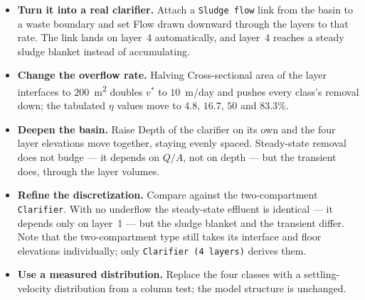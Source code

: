 \documentclass[11pt,a4paper]{article}
\newcommand{\code}[1]{\texttt{\small #1}}
\newcommand{\menu}[1]{\textsf{#1}}
\begin{document}
\begin{itemize}[leftmargin=1.4em]
\item \textbf{Turn it into a real clarifier.} Attach a \code{Sludge flow} link
      from the basin to a waste boundary and set \menu{Flow drawn downward
      through the layers} to that rate. The link lands on layer~4 automatically,
      and layer~4 reaches a steady sludge blanket instead of accumulating.
\item \textbf{Change the overflow rate.} Halving \menu{Cross-sectional area of
      the layer interfaces} to $200$~m\textsuperscript{2} doubles $v^{*}$ to
      $10$~m/day and pushes every class's removal down; the tabulated $\eta$
      values move to $4.8$, $16.7$, $50$ and $83.3\%$.
\item \textbf{Deepen the basin.} Raise \menu{Depth of the clarifier} on its own
      and the four layer elevations move together, staying evenly spaced.
      Steady-state removal does not budge --- it depends on $Q/A$, not on depth
      --- but the transient does, through the layer volumes.
\item \textbf{Refine the discretization.} Compare against the two-compartment
      \code{Clarifier}. With no underflow the steady-state effluent is identical
      --- it depends only on layer~1 --- but the sludge blanket and the transient
      differ. Note that the two-compartment type still takes its interface and
      floor elevations individually; only \code{Clarifier (4 layers)} derives
      them.
\item \textbf{Use a measured distribution.} Replace the four classes with a
      settling-velocity distribution from a column test; the model structure is
      unchanged.
\end{itemize}
\end{document}
